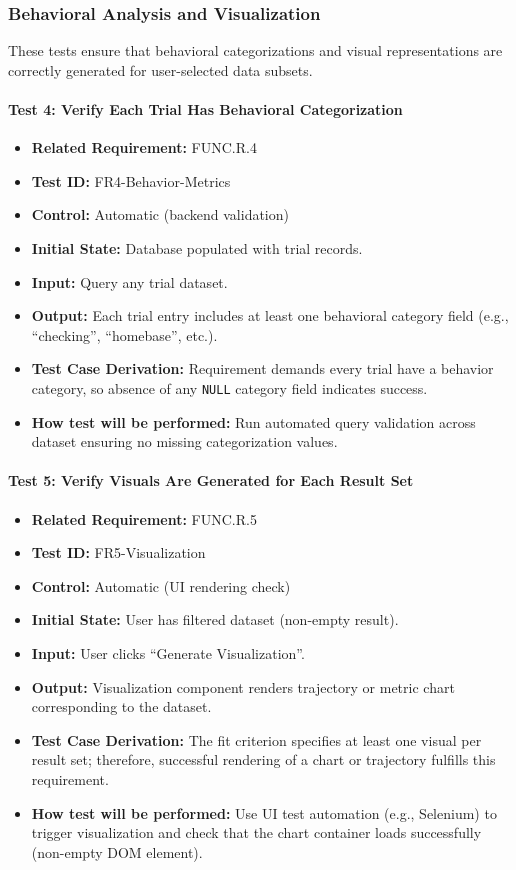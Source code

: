 \documentclass[12pt, titlepage]{article}
\begin{document}
\subsubsection{Behavioral Analysis and Visualization}

These tests ensure that behavioral categorizations and visual representations are correctly generated for user-selected data subsets.

\paragraph{Test 4: Verify Each Trial Has Behavioral Categorization}
\begin{itemize}
    \item \textbf{Related Requirement:} FUNC.R.4
    \item \textbf{Test ID:} FR4-Behavior-Metrics
    \item \textbf{Control:} Automatic (backend validation)
    \item \textbf{Initial State:} Database populated with trial records.
    \item \textbf{Input:} Query any trial dataset.
    \item \textbf{Output:} Each trial entry includes at least one behavioral category field (e.g., ``checking'', ``homebase'', etc.).
    \item \textbf{Test Case Derivation:} Requirement demands every trial have a behavior category, so absence of any \texttt{NULL} category field indicates success.
    \item \textbf{How test will be performed:} Run automated query validation across dataset ensuring no missing categorization values.
\end{itemize}

\paragraph{Test 5: Verify Visuals Are Generated for Each Result Set}
\begin{itemize}
    \item \textbf{Related Requirement:} FUNC.R.5
    \item \textbf{Test ID:} FR5-Visualization
    \item \textbf{Control:} Automatic (UI rendering check)
    \item \textbf{Initial State:} User has filtered dataset (non-empty result).
    \item \textbf{Input:} User clicks ``Generate Visualization''.
    \item \textbf{Output:} Visualization component renders trajectory or metric chart corresponding to the dataset.
    \item \textbf{Test Case Derivation:} The fit criterion specifies at least one visual per result set; therefore, successful rendering of a chart or trajectory fulfills this requirement.
    \item \textbf{How test will be performed:} Use UI test automation (e.g., Selenium) to trigger visualization and check that the chart container loads successfully (non-empty DOM element).
\end{itemize}
\end{document}
